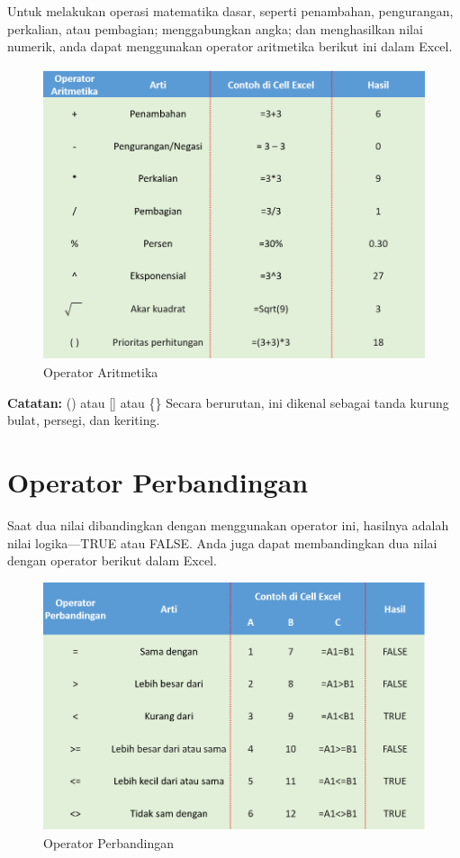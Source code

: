 \documentclass[
]{book}
\begin{document}
Untuk melakukan operasi matematika dasar, seperti penambahan, pengurangan, perkalian, atau pembagian; menggabungkan angka; dan menghasilkan nilai numerik, anda dapat menggunakan operator aritmetika berikut ini dalam Excel.

\begin{figure}

{\centering \includegraphics[width=0.75\linewidth]{images/aritmatika} 

}

\caption{Operator Aritmetika}\label{fig:aritmatika}
\end{figure}

\textbf{Catatan:} () atau {[}{]} atau \{\} Secara berurutan, ini dikenal sebagai tanda kurung bulat, persegi, dan keriting.

\hypertarget{operator-perbandingan}{%
\section{Operator Perbandingan}\label{operator-perbandingan}}

Saat dua nilai dibandingkan dengan menggunakan operator ini, hasilnya adalah nilai logika---TRUE atau FALSE. Anda juga dapat membandingkan dua nilai dengan operator berikut dalam Excel.

\begin{figure}

{\centering \includegraphics[width=0.75\linewidth]{images/perbandingan} 

}

\caption{Operator Perbandingan}\label{fig:perbandingan}
\end{figure}
\end{document}
